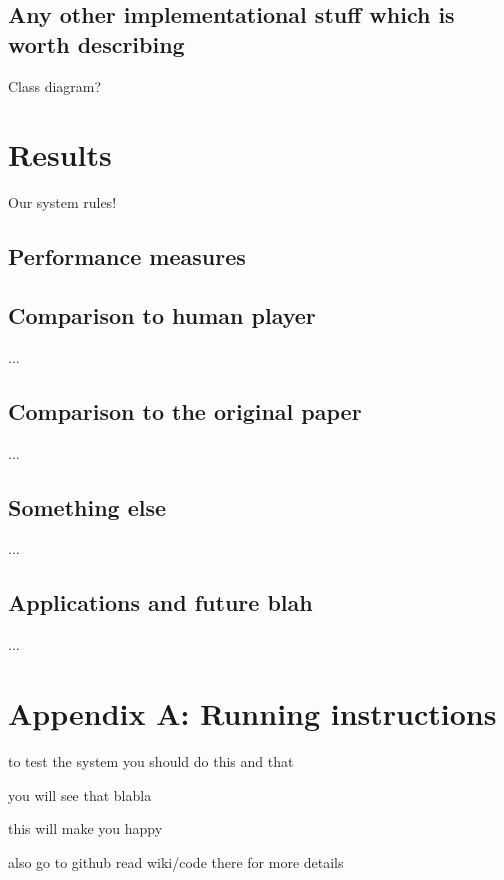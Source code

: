 \documentclass[a4paper,12pt]{article}
\begin{document}
\subsection{Any other implementational stuff which is worth describing}
Class diagram?


%
%
\pagebreak
\section{Results}
Our system rules!

\subsection{Performance measures}

\subsection{Comparison to human player}
...

\subsection{Comparison to the original paper}
...

\subsection{Something else}
...

\subsection{Applications and future blah}
...



%
%
\pagebreak
\section*{Appendix A: Running instructions}
to test the system you should do this and that

you will see that blabla

this will make you happy

also go to github read wiki/code there for more details



%
%
\pagebreak
{}


\end{document}
